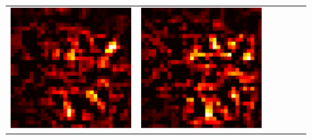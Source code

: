 \documentclass[preprint,12pt]{elsarticle}
\begin{document}
\begin{figure}[ht]
\begin{tabular}{cccccc}
  \includegraphics[scale=\scale]{../visualizations/examples/cifar10/cnn/active_saliency_map/1.png} & 
  \includegraphics[scale=\scale]{../visualizations/examples/cifar10/cnn/inactive_saliency_map/1.png} \\
  

\end{tabular}
\end{figure}
\end{document}
